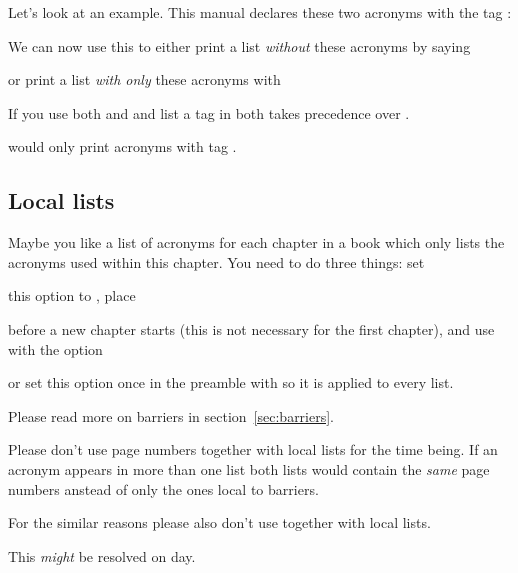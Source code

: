 \documentclass{acro-manual}
\begin{document}
Let's look at an example. This manual declares these two acronyms with the tag
:
\begin{sourcecode}
\end{sourcecode}
We can now use this to either print a list \emph{without} these acronyms by
saying
\begin{sourcecode}
  \printacronyms[exclude=city]
\end{sourcecode}
or print a list \emph{with only} these acronyms with
\begin{example}
  \printacronyms[include=city,heading=none]
\end{example}
\begin{bewareofthedog}
  If you use both  and  and list a tag in both
   takes precedence over .
  \begin{sourcecode}
  \printacronyms[exclude={a,b},include={b,c}]
  \end{sourcecode}
  would only print acronyms with tag .
\end{bewareofthedog}

\subsection{Local lists}\label{sec:local-lists}
Maybe you like a list of acronyms for each chapter in a book which only lists
the acronyms used within this chapter.  You need to do three things: set
\begin{options}
    this option to , place
\end{options}
\begin{commands}
    before a new chapter starts (this is not necessary for the first chapter),
    and use  with the option
\end{commands}
\begin{options}
    or set this option once in the preamble with  so it is applied
    to every list.
\end{options}
Please read more on barriers in section~\vref{sec:barriers}.
\begin{bewareofthedog}
  Please don't use page numbers together with local lists for the time being.
  If an acronym appears in more than one list both lists would contain the
  \emph{same} page numbers anstead of only the ones local to barriers.

  For the similar reasons please also don't use  together
  with local lists.

  This \emph{might} be resolved on day.
\end{bewareofthedog}
\end{document}
